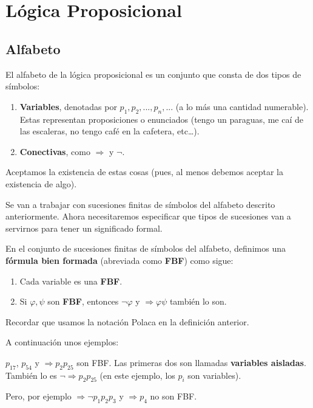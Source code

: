\documentclass[12pt]{report}
\theoremstyle{largebreak}
\begin{document}
    \chapter{Lógica Proposicional}

    \section{Alfabeto}

    El alfabeto de la lógica proposicional es un conjunto que consta de dos tipos de símbolos:
    \begin{enumerate}
        \item \textbf{Variables}, denotadas por $p_1,p_2,...,p_n,...$ (a lo más una cantidad numerable). Estas representan proposiciones o enunciados (tengo un paraguas, me caí de las escaleras, no tengo café en la cafetera, etc\dots).
        \item \textbf{Conectivas}, como $\Rightarrow$ y $\neg$.
    \end{enumerate}
    Aceptamos la existencia de estas cosas (pues, al menos debemos aceptar la existencia de algo).

    Se van a trabajar con sucesiones finitas de símbolos del alfabeto descrito anteriormente. Ahora necesitaremos especificar que tipos de sucesiones van a servirnos para tener un significado formal.

    \begin{mydef}
        En el conjunto de sucesiones finitas de símbolos del alfabeto, definimos una \textbf{fórmula bien formada} (abreviada como \textbf{FBF}) como sigue:
        \begin{enumerate}
            \item Cada variable es una \textbf{FBF}.
            \item Si $\varphi,\psi$ son \textbf{FBF}, entonces $\neg\varphi$ y $\Rightarrow\varphi\psi$ también lo son.
        \end{enumerate}
    \end{mydef}

    \begin{obs}
        Recordar que usamos la notación Polaca en la definición anterior.
    \end{obs}

    A continuación unos ejemplos:
    
    \begin{exa}
        $p_{17}$, $p_{54}$ y $\Rightarrow p_2p_{25}$ son FBF. Las primeras dos son llamadas \textbf{variables aisladas}. También lo es $\neg \Rightarrow p_2p_{25}$ (en este ejemplo, los $p_i$ son variables).

        Pero, por ejemplo $\Rightarrow \neg p_1 p_2 p_3$ y $\Rightarrow p_4$ no son FBF.
    \end{exa}
\end{document}
